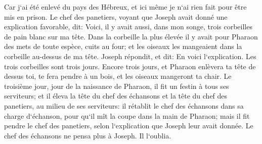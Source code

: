 \verse Car j`ai été enlevé du pays des Hébreux, et ici même je n`ai rien fait pour être mis en prison. 
\verse Le chef des panetiers, voyant que Joseph avait donné une explication favorable, dit: Voici, il y avait aussi, dans mon songe, trois corbeilles de pain blanc sur ma tête. 
\verse Dans la corbeille la plus élevée il y avait pour Pharaon des mets de toute espèce, cuits au four; et les oiseaux les mangeaient dans la corbeille au-dessus de ma tête. 
\verse Joseph répondit, et dit: En voici l`explication. Les trois corbeilles sont trois jours. 
\verse Encore trois jours, et Pharaon enlèvera ta tête de dessus toi, te fera pendre à un bois, et les oiseaux mangeront ta chair. 
\verse Le troisième jour, jour de la naissance de Pharaon, il fit un festin à tous ses serviteurs; et il éleva la tête du chef des échansons et la tête du chef des panetiers, au milieu de ses serviteurs: 
\verse il rétablit le chef des échansons dans sa charge d`échanson, pour qu`il mît la coupe dans la main de Pharaon; 
\verse mais il fit pendre le chef des panetiers, selon l`explication que Joseph leur avait donnée. 
\verse Le chef des échansons ne pensa plus à Joseph. Il l`oublia. 

